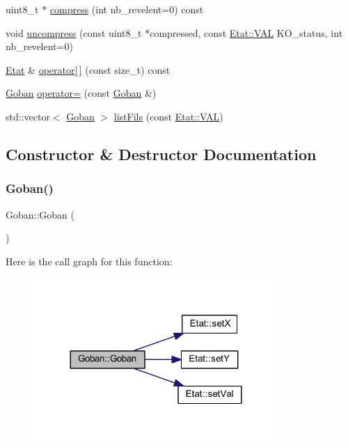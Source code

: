 \begin{DoxyCompactItemize}
uint8\+\_\+t $\ast$ \hyperlink{class_goban_a8ad67a618a510bb378d00281228b1b13}{compress} (int nb\+\_\+revelent=0) const
\item 
void \hyperlink{class_goban_aa23b735d8d72bb0fe189005e968e9329}{uncompress} (const uint8\+\_\+t $\ast$compressed, const \hyperlink{class_etat_af3ddb2296ffc379b7f3ad2bf832f294e}{Etat\+::\+V\+AL} K\+O\+\_\+status, int nb\+\_\+revelent=0)
\item 
\hyperlink{class_etat}{Etat} \& \hyperlink{class_goban_a39eb0323bdb4f3cb5fc00719dd47f938}{operator\mbox{[}$\,$\mbox{]}} (const size\+\_\+t) const
\item 
\hyperlink{class_goban}{Goban} \hyperlink{class_goban_af02f839ac464fc547dd98bc44bae1ef8}{operator=} (const \hyperlink{class_goban}{Goban} \&)
\item 
std\+::vector$<$ \hyperlink{class_goban}{Goban} $>$ \hyperlink{class_goban_a36ab256c9430e070b620052a0f13f051}{list\+Fils} (const \hyperlink{class_etat_af3ddb2296ffc379b7f3ad2bf832f294e}{Etat\+::\+V\+AL})
\end{DoxyCompactItemize}


\subsection{Constructor \& Destructor Documentation}
\mbox{\label{class_goban_a3544d30f54fbb54bd9e4fed08aa4bce6}} 
\subsubsection{\texorpdfstring{Goban()}{Goban()}\hspace{0.1cm}{\footnotesize\ttfamily [1/2]}}
{\footnotesize\ttfamily Goban\+::\+Goban (\begin{DoxyParamCaption}{ }\end{DoxyParamCaption})}

Here is the call graph for this function\+:
\nopagebreak
\begin{figure}[H]
\begin{center}
\leavevmode
\includegraphics[width=264pt]{class_goban_a3544d30f54fbb54bd9e4fed08aa4bce6_cgraph}
\end{center}
\end{figure}
\mbox{\label{class_goban_a8c49da36e406f11d33671a4c8a4c19b2}} 
